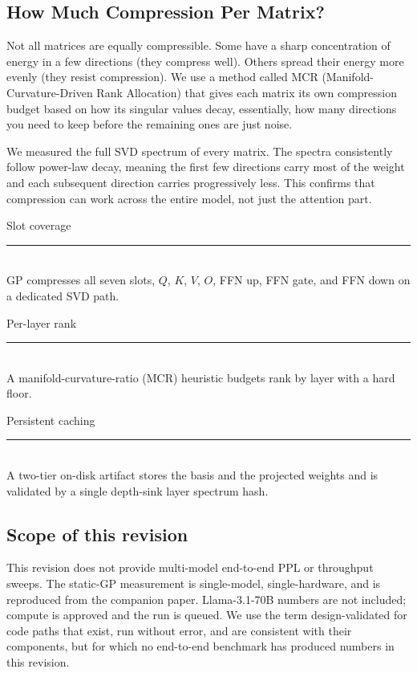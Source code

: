 \documentclass[11pt]{article}
\begin{document}
\subsection{How Much Compression Per Matrix?}

Not all matrices are equally compressible. Some have a sharp concentration of
energy in a few directions (they compress well). Others spread their energy
more evenly (they resist compression). We use a method called MCR
(Manifold-Curvature-Driven Rank Allocation) that gives each matrix its own
compression budget based on how its singular values decay, essentially, how
many directions you need to keep before the remaining ones are just noise.

We measured the full SVD spectrum of every matrix. The spectra consistently
follow power-law decay, meaning the first few directions carry most of the
weight and each subsequent direction carries progressively less. This confirms
that compression can work across the entire model, not just the attention part.

\begin{center}
\begin{minipage}[t]{0.31\linewidth}\centering\small
Slot coverage\\[2pt]
\rule{0.7\linewidth}{0.4pt}\\[2pt]
GP compresses all seven slots, $Q$, $K$, $V$, $O$, FFN up, FFN gate, and
FFN down on a dedicated SVD path.
\end{minipage}\hfill
\begin{minipage}[t]{0.31\linewidth}\centering\small
Per-layer rank\\[2pt]
\rule{0.7\linewidth}{0.4pt}\\[2pt]
A manifold-curvature-ratio (MCR) heuristic budgets rank by layer with a
hard floor.
\end{minipage}\hfill
\begin{minipage}[t]{0.31\linewidth}\centering\small
Persistent caching\\[2pt]
\rule{0.7\linewidth}{0.4pt}\\[2pt]
A two-tier on-disk artifact stores the basis and the projected weights
and is validated by a single depth-sink layer spectrum hash.
\end{minipage}
\end{center}

\subsection{Scope of this revision}
This revision does not provide multi-model end-to-end PPL or throughput
sweeps. The static-GP measurement is single-model, single-hardware, and
is reproduced from the companion paper. Llama-3.1-70B numbers are not
included; compute is approved and the run is queued. We use the term
design-validated for code paths that exist, run without error, and are
consistent with their components, but for which no end-to-end benchmark
has produced numbers in this revision.
\end{document}
